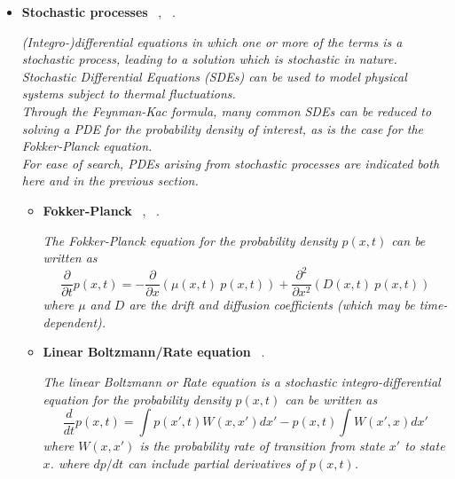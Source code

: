 \documentclass[12pt,letterpaper]{article}
\begin{document}
\begin{itemize}
\begin{itemize}
\begin{itemize}
                \textit{Stefan problems are a particular kind of boundary value problems for a system of PDEs in which the boundary between the phases can move with time.}
                
            \end{itemize}
		\end{itemize}

    \item \textbf{Stochastic processes}  ~\cite{kuboVariationalQuantumSimulations2020, alghassiVariationalQuantumAlgorithm2022},  ~\cite{anQuantumacceleratedMultilevelMonte2021}.

    \emph{(Integro-)differential equations in which one or more of the terms is a stochastic process, leading to a solution which is stochastic in nature. Stochastic Differential Equations (SDEs) can be used to model physical systems subject to thermal fluctuations.\\
    Through the Feynman-Kac formula, many common SDEs can be reduced to solving a PDE for the probability density of interest, as is the case for the Fokker-Planck equation.\\
    For ease of search, PDEs arising from stochastic processes are indicated both here and in the previous section.}

   \begin{itemize} 
        \item \textbf{Fokker-Planck}  ~\cite{jinQuantumSimulationPartial2022a},  ~\cite{garcia-ripollQuantuminspiredAlgorithmsMultivariate2021}.
        
        \textit{The Fokker-Planck equation for the probability density $p(x,t)$ can be written as}
        $$ \dfrac{\partial }{\partial t} p(x,t)  = - \dfrac{\partial }{\partial x} \left( \mu(x,t)~p(x,t)  \right) + \dfrac{\partial^2 }{\partial x^2} \left( D(x,t)~p(x,t)  \right)$$
        \textit{where $\mu$ and $D$ are the drift and diffusion coefficients (which may be time-dependent).}

        \item \textbf{Linear Boltzmann/Rate equation}  ~\cite{jinQuantumSimulationPartial2022a}.

        \textit{The linear Boltzmann or Rate equation  is a stochastic integro-differential equation  for the probability density $p(x,t)$ can be written as}
        $$ \dfrac{d }{d t} p(x,t)  = \int p(x',t) W(x,x') dx' - p(x,t) \int W(x',x) dx' $$
        \textit{where $W(x,x')$ is the probability rate of transition from state $x'$ to state $x$. 
        where $dp/dt$ can include partial derivatives of $p(x,t)$. }
        

\end{itemize}
\end{itemize}
\end{document}
